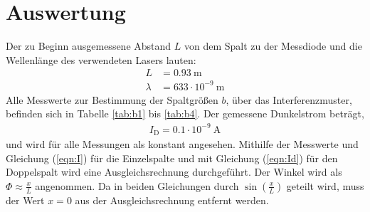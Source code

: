 \section{Auswertung}
\label{sec:Auswertung}

Der zu Beginn ausgemessene Abstand $L$ von dem Spalt zu der Messdiode und die Wellenlänge des verwendeten Lasers lauten:
\begin{align*}
  L &= 0.93 \ \text{m} \\
  \lambda &= 633 \cdot 10^{-9} \ \text{m}
\end{align*}
Alle Messwerte zur Bestimmung der Spaltgrößen $b$, über das Interferenzmuster, befinden sich in Tabelle \ref{tab:b1} bis \ref{tab:b4}. Der gemessene Dunkelstrom beträgt,
\begin{align*}
  I_\text{D} = 0.1 \cdot 10^{-9} \ \text{A}
\end{align*}
und wird für alle Messungen als konstant angesehen. Mithilfe der Messwerte und Gleichung (\ref{eqn:I}) für die Einzelspalte und mit Gleichung (\ref{eqn:Id}) für den Doppelspalt wird eine Ausgleichsrechnung durchgeführt. Der Winkel wird als $\Phi \approx \frac{x}{L}$ angenommen. Da in beiden Gleichungen durch $\sin(\frac{x}{L})$ geteilt wird, muss der Wert $x = 0$ aus der Ausgleichsrechnung entfernt werden.

